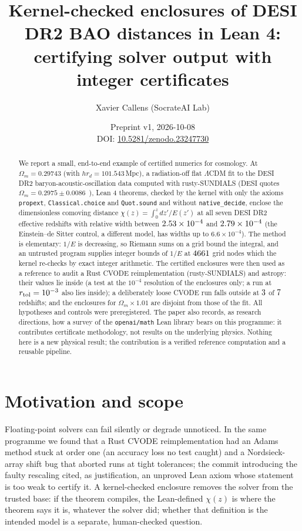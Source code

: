 \documentclass[11pt]{article}
\title{Kernel-checked enclosures of DESI DR2 BAO distances in Lean 4:\\
certifying solver output with integer certificates}
\author{Xavier Callens (SocrateAI Lab)}
\date{Preprint v1, 2026-10-08\\ DOI: \href{https://doi.org/10.5281/zenodo.23247730}{10.5281/zenodo.23247730}}
\theoremstyle{remark}
\begin{document}
\maketitle

\begin{abstract}
We report a small, end-to-end example of certified numerics for cosmology. At $\Omega_m=0.29743$ (with $h r_d=101.543$\,Mpc), a radiation-off flat $\Lambda$CDM fit to the DESI DR2
baryon-acoustic-oscillation data computed with rusty-SUNDIALS (DESI quotes $\Omega_m=0.2975\pm0.0086$~\cite{desi}), Lean 4 theorems, checked by the kernel with
only the axioms \texttt{propext}, \texttt{Classical.choice} and \texttt{Quot.sound} and without \texttt{native\_decide},
enclose the dimensionless comoving distance $\chi(z)=\int_0^z dz'/E(z')$ at all seven DESI DR2 effective redshifts with
relative width between $2.53\times10^{-4}$ and $2.79\times10^{-4}$ (the Einstein--de Sitter control, a different model, has widths up to $6.6\times10^{-4}$). The method is elementary: $1/E$ is decreasing, so Riemann sums on a grid
bound the integral, and an untrusted program supplies integer bounds of $1/E$ at $4661$ grid nodes which the kernel
re-checks by exact integer arithmetic. The certified enclosures were then used as a reference to audit a Rust CVODE
reimplementation (rusty-SUNDIALS) and astropy: their values lie inside (a test at the $10^{-4}$ resolution of the enclosures only;
a run at $r_{\rm tol}=10^{-3}$ also lies inside); a deliberately loose CVODE run falls outside at
$3$ of $7$ redshifts; and the enclosures for $\Omega_m\times1.01$ are disjoint from those of the fit.
All hypotheses and controls were preregistered. The paper also records, as research directions, how a survey of the
\texttt{openai/math} Lean library bears on this programme: it contributes certificate methodology, not results on the
underlying physics. Nothing here is a new physical result; the contribution is a verified reference computation and a
reusable pipeline.
\end{abstract}

\section{Motivation and scope}
Floating-point solvers can fail silently or degrade unnoticed. In the same programme we found that a Rust CVODE
reimplementation had an Adams method stuck at order one (an accuracy loss no test caught) and a Nordsieck-array shift bug that
aborted runs at tight tolerances; the commit introducing the faulty rescaling cited, as justification, an unproved Lean axiom whose
statement is too weak to certify it. A kernel-checked enclosure removes the solver from the trusted base: if the theorem compiles,
the Lean-defined $\chi(z)$ is where the theorem says it is, whatever the solver did; whether that definition is the intended model is
a separate, human-checked question.
\end{document}
